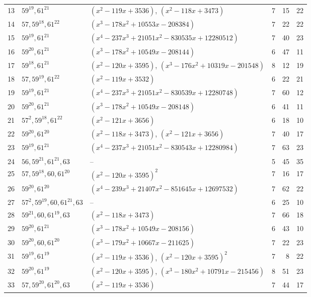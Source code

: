 \documentclass[11pt]{article}
\theoremstyle{definition}
\begin{document}
{\begin{longtable}{rlp{6.2cm}rrr}
13 & $59^{19}, 61^{21}$ & $(x^{2} - 119x + 3536)$, $(x^{2} - 118x + 3473)$ & 7 & 15 & 22 \\
14 & $57, 59^{18}, 61^{22}$ & $(x^{3} - 178x^{2} + 10553x - 208384)$ & 7 & 22 & 22 \\
15 & $59^{19}, 61^{21}$ & $(x^{4} - 237x^{3} + 21051x^{2} - 830535x + 12280512)$ & 7 & 40 & 23 \\
16 & $59^{20}, 61^{21}$ & $(x^{3} - 178x^{2} + 10549x - 208144)$ & 6 & 47 & 11 \\
17 & $59^{18}, 61^{21}$ & $(x^{2} - 120x + 3595)$, $(x^{3} - 176x^{2} + 10319x - 201548)$ & 8 & 12 & 19 \\
18 & $57, 59^{19}, 61^{22}$ & $(x^{2} - 119x + 3532)$ & 6 & 22 & 21 \\
19 & $59^{19}, 61^{21}$ & $(x^{4} - 237x^{3} + 21051x^{2} - 830539x + 12280748)$ & 7 & 60 & 12 \\
20 & $59^{20}, 61^{21}$ & $(x^{3} - 178x^{2} + 10549x - 208148)$ & 6 & 41 & 11 \\
21 & $57^{2}, 59^{18}, 61^{22}$ & $(x^{2} - 121x + 3656)$ & 6 & 18 & 10 \\
22 & $59^{20}, 61^{20}$ & $(x^{2} - 118x + 3473)$, $(x^{2} - 121x + 3656)$ & 7 & 40 & 17 \\
23 & $59^{19}, 61^{21}$ & $(x^{4} - 237x^{3} + 21051x^{2} - 830543x + 12280984)$ & 7 & 63 & 23 \\
24 & $56, 59^{21}, 61^{21}, 63$ & -- & 5 & 45 & 35 \\
25 & $57, 59^{18}, 60, 61^{20}$ & $(x^{2} - 120x + 3595)^{2}$ & 7 & 16 & 17 \\
26 & $59^{20}, 61^{20}$ & $(x^{4} - 239x^{3} + 21407x^{2} - 851645x + 12697532)$ & 7 & 62 & 22 \\
27 & $57^{2}, 59^{19}, 60, 61^{21}, 63$ & -- & 6 & 25 & 10 \\
28 & $59^{21}, 60, 61^{19}, 63$ & $(x^{2} - 118x + 3473)$ & 7 & 66 & 18 \\
29 & $59^{20}, 61^{21}$ & $(x^{3} - 178x^{2} + 10549x - 208156)$ & 6 & 43 & 10 \\
30 & $59^{20}, 60, 61^{20}$ & $(x^{3} - 179x^{2} + 10667x - 211625)$ & 7 & 22 & 23 \\
31 & $59^{19}, 61^{19}$ & $(x^{2} - 119x + 3536)$, $(x^{2} - 120x + 3595)^{2}$ & 7 & 8 & 22 \\
32 & $59^{20}, 61^{19}$ & $(x^{2} - 120x + 3595)$, $(x^{3} - 180x^{2} + 10791x - 215456)$ & 8 & 51 & 23 \\
33 & $57, 59^{20}, 61^{20}, 63$ & $(x^{2} - 119x + 3536)$ & 7 & 44 & 17 \\

\end{longtable}}
\end{document}
